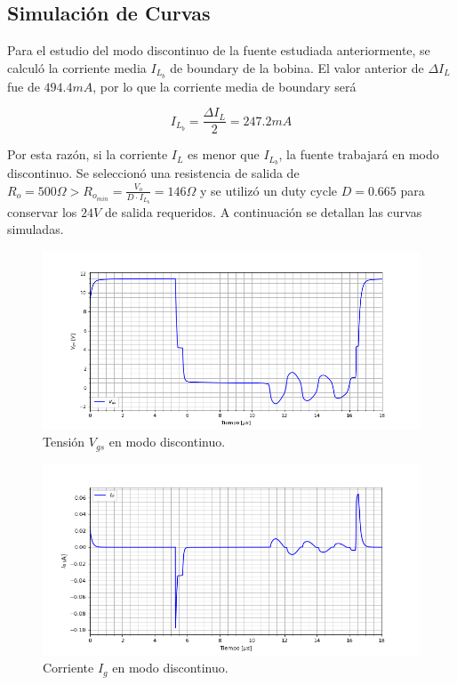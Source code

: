 %

%

\subsection{Simulación de Curvas}

Para el estudio del modo discontinuo de la fuente estudiada anteriormente, se calculó la corriente media $I_{L_b}$ de boundary de la bobina. El valor anterior de $\Delta I_L$ fue de $494.4mA$, por lo que la corriente media de boundary será

\begin{equation}
I_{L_b} = \frac{\Delta I_L}{2} = 247.2mA
\label{ej4:eq:il_boundary}
\end{equation}

Por esta razón, si la corriente $I_L$ es menor que $I_{L_b}$, la fuente trabajará en modo discontinuo. Se seleccionó una resistencia de salida de $R_o = 500\Omega > R_{o_{min}} = \frac{V_o}{D \cdot I_{L_b}} = 146\Omega$  y se utilizó un duty cycle $D = 0.665$ para conservar los $24V$ de salida requeridos. A continuación se detallan las curvas simuladas.

\begin{figure}[H]
	\centering
	\includegraphics[width=0.85\linewidth]{ImagenesEjercicio-4/vgs}
	\caption{Tensión $V_{gs}$ en modo discontinuo.}
	\label{ej4:fig:vgs}
\end{figure}

\begin{figure}[H]
	\centering
	\includegraphics[width=0.85\linewidth]{ImagenesEjercicio-4/ig}
	\caption{Corriente $I_g$ en modo discontinuo.}
	\label{ej4:fig:ig}
\end{figure}

